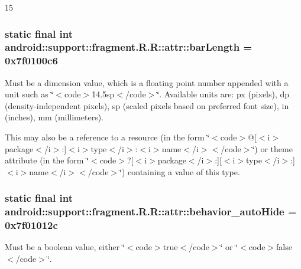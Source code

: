 15\hypertarget{classandroid_1_1support_1_1fragment_1_1_r_1_1attr_7bf3a02dacbe3510a51899b46d9f513a}{
\subsubsection[{barLength}]{\setlength{\rightskip}{0pt plus 5cm}static final int android::support::fragment.R.R::attr::barLength = 0x7f0100c6}}
\label{classandroid_1_1support_1_1fragment_1_1_r_1_1attr_7bf3a02dacbe3510a51899b46d9f513a}


Must be a dimension value, which is a floating point number appended with a unit such as \char`\"{}$<$code$>$14.5sp$<$/code$>$\char`\"{}. Available units are: px (pixels), dp (density-independent pixels), sp (scaled pixels based on preferred font size), in (inches), mm (millimeters). 

This may also be a reference to a resource (in the form \char`\"{}$<$code$>$@\mbox{[}$<$i$>$package$<$/i$>$:\mbox{]}$<$i$>$type$<$/i$>$:$<$i$>$name$<$/i$>$$<$/code$>$\char`\"{}) or theme attribute (in the form \char`\"{}$<$code$>$?\mbox{[}$<$i$>$package$<$/i$>$:\mbox{]}\mbox{[}$<$i$>$type$<$/i$>$:\mbox{]}$<$i$>$name$<$/i$>$$<$/code$>$\char`\"{}) containing a value of this type. \hypertarget{classandroid_1_1support_1_1fragment_1_1_r_1_1attr_271bc50853990b92e1a5aae62535ccf6}{
\subsubsection[{behavior\_\-autoHide}]{\setlength{\rightskip}{0pt plus 5cm}static final int android::support::fragment.R.R::attr::behavior\_\-autoHide = 0x7f01012c}}
\label{classandroid_1_1support_1_1fragment_1_1_r_1_1attr_271bc50853990b92e1a5aae62535ccf6}


Must be a boolean value, either \char`\"{}$<$code$>$true$<$/code$>$\char`\"{} or \char`\"{}$<$code$>$false$<$/code$>$\char`\"{}. 

